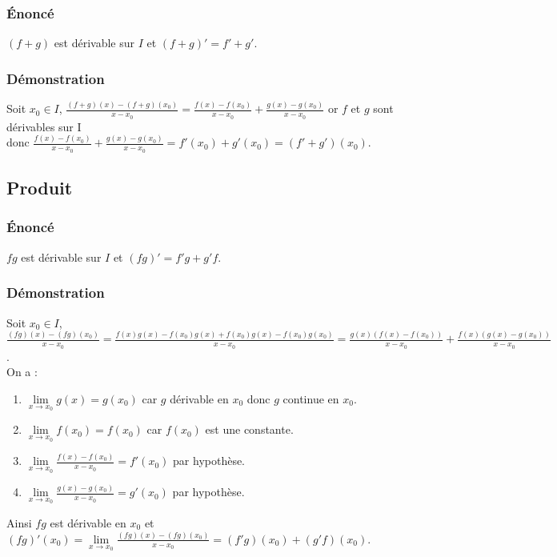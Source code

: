 \documentclass[a4paper,10pt]{book} %
\begin{document}
\subsubsection{Énoncé}
$(f+g)$ est dérivable sur $I$ et $(f+g)'=f'+g'$.

\subsubsection{Démonstration}
Soit $x_{0}\in I$, $\frac{(f+g)(x)-(f+g)(x_{0})}{x-x_{0}}=\frac{f(x)-f(x_{0})}{x-x_{0}}+\frac{g(x)-g(x_{0})}{x-x_{0}}$ or $f$ et $g$ sont dérivables sur I\\
donc $\frac{f(x)-f(x_{0})}{x-x_{0}}+\frac{g(x)-g(x_{0})}{x-x_{0}}=f'(x_{0})+g'(x_{0})=(f'+g')(x_{0})$.

\subsection{Produit}
\subsubsection{Énoncé}
$fg$ est dérivable sur $I$ et $(fg)'=f'g+g'f$.

\subsubsection{Démonstration}
Soit $x_{0}\in I$, $\frac{(fg)(x)-(fg)(x_{0})}{x-x_{0}}=\frac{f(x)g(x)-f(x_{0})g(x)+f(x_{0})g(x)-f(x_{0})g(x_{0})}{x-x_{0}}=\frac{g(x)(f(x)-f(x_{0}))}{x-x_{0}}+\frac{f(x)(g(x)-g(x_{0}))}{x-x_{0}}$.\\

On a :\begin{enumerate}
\item $\lim\limits_{x\rightarrow x_{0}}g(x)=g(x_{0})$ car $g$ dérivable en $x_{0}$ donc $g$ continue en $x_0$.
\item $\lim\limits_{x\rightarrow x_{0}}f(x_{0})=f(x_{0})$ car $f(x_{0})$ est une constante.
\item $\lim\limits_{x\rightarrow x_{0}}\frac{f(x)-f(x_{0})}{x-x_{0}}=f'(x_{0})$ par hypothèse.
\item $\lim\limits_{x\rightarrow x_{0}}\frac{g(x)-g(x_{0})}{x-x_{0}}=g'(x_{0})$ par hypothèse.
\end{enumerate}

Ainsi $fg$ est dérivable en $x_0$ et $(fg)'(x_0)= \lim\limits_{x\rightarrow x_{0}}\frac{(fg)(x)-(fg)(x_{0})}{x-x_{0}}=(f'g)(x_{0})+(g'f)(x_0)$.
\end{document}

